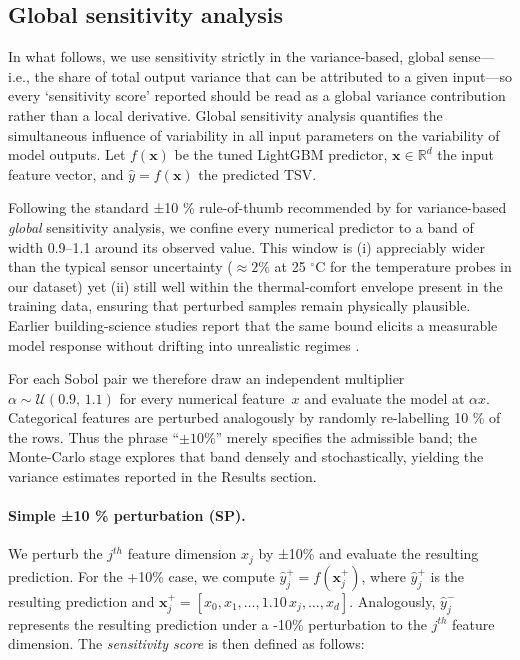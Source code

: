 \documentclass{article}
\theoremstyle{plain}
\theoremstyle{definition}
\theoremstyle{remark}
\begin{document}
\subsection{Global sensitivity analysis}\label{ssec:sens}

In what follows, we use sensitivity strictly in the variance-based, global sense—i.e., the share of total output variance that can be attributed to a given input—so every ‘sensitivity score’ reported should be read as a global variance contribution rather than a local derivative. Global sensitivity analysis quantifies the simultaneous influence of variability in all input parameters on the variability of model outputs\cite{ignjatovicSensitivityAnalysisDaily2016,peisMissingDataImputation2022}. Let \(f(\mathbf{x})\) be the tuned LightGBM predictor,  \(\mathbf{x}\in\mathbb{R}^{d}\) the input feature vector, and \(\widehat{y}=f(\mathbf{x})\) the predicted TSV.  

Following the standard ±10 \% rule-of-thumb recommended by \citet{saltelli2010variance} for variance-based \emph{global} sensitivity analysis, we confine every numerical predictor to a band of width 0.9–1.1 around its observed value. This window is (i) appreciably wider than the typical sensor uncertainty ($\approx 2\%$ at 25 $^{\circ}$C for the temperature probes in our dataset) yet (ii) still well within the thermal-comfort envelope present in the training data, ensuring that perturbed samples remain physically plausible.  Earlier building-science studies report that the same bound elicits a measurable model response without drifting into unrealistic regimes
\citep{Ignjatovic2016,Gagnon2018}.

For each Sobol pair we therefore draw an independent multiplier $\alpha \sim \mathcal{U}(0.9,\,1.1)$ for every numerical feature~$x$ and evaluate the model at $\alpha x$. Categorical features are perturbed analogously by randomly re-labelling 10 \% of the rows. Thus the phrase “$\pm 10\%$” merely specifies the admissible band; the Monte-Carlo stage explores that band densely and stochastically, yielding the variance estimates reported in the Results section.

\paragraph{Simple ±10 \% perturbation (SP).}
We perturb the \(j^{th}\) feature dimension \(x_{j}\) by ±10\% and evaluate the resulting prediction. For the +10\% case, we compute
\(\widehat{y}_{j}^{+} = f(\mathbf{x}_{j}^{+})\), where \(\widehat{y}_{j}^{+}\) is the resulting prediction and \(\mathbf{x}_{j}^{+} = [x_{0}, x_{1}, \dots, 1.10\,x_{j}, \dots, x_{d}]\).
Analogously, \(\widehat{y}_{j}^{-}\) represents the resulting prediction under a -10\% perturbation to the \(j^{th}\) feature dimension.
The \emph{sensitivity score} is then defined as follows: 
\end{document}
